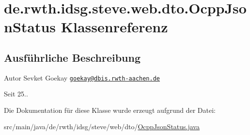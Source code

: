 \hypertarget{classde_1_1rwth_1_1idsg_1_1steve_1_1web_1_1dto_1_1_ocpp_json_status}{\section{de.\-rwth.\-idsg.\-steve.\-web.\-dto.\-Ocpp\-Json\-Status Klassenreferenz}
\label{classde_1_1rwth_1_1idsg_1_1steve_1_1web_1_1dto_1_1_ocpp_json_status}
}


\subsection{Ausführliche Beschreibung}
\begin{DoxyAuthor}{Autor}
Sevket Goekay \href{mailto:goekay@dbis.rwth-aachen.de}{\tt goekay@dbis.\-rwth-\/aachen.\-de} 
\end{DoxyAuthor}
\begin{DoxySince}{Seit}
25.. 
\end{DoxySince}


Die Dokumentation für diese Klasse wurde erzeugt aufgrund der Datei\-:\begin{DoxyCompactItemize}
\item 
src/main/java/de/rwth/idsg/steve/web/dto/\hyperlink{_ocpp_json_status_8java}{Ocpp\-Json\-Status.\-java}\end{DoxyCompactItemize}
